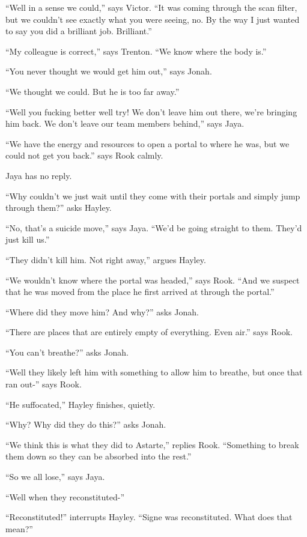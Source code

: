 ``Well in a sense we could,'' says Victor.  ``It was coming through the scan filter, but we couldn't see exactly what you were seeing, no.  By the way I just wanted to say you did a brilliant job.  Brilliant.''

``My colleague is correct,'' says Trenton.  ``We know where the body is.''

``You never thought we would get him out,'' says Jonah.

``We thought we could. But he is too far away.''

``Well you fucking better well try!  We don't leave him out there, we're bringing him back.  We don't leave our team members behind,'' says Jaya.

``We have the energy and resources to open a portal to where he was, but we could not get you back.'' says Rook calmly.

Jaya has no reply.

``Why couldn't we just wait until they come with their portals and simply jump through them?'' asks Hayley.

``No, that's a suicide move,'' says Jaya.  ``We'd be going straight to them.  They'd just kill us.''

``They didn't kill him.  Not right away,'' argues Hayley.

``We wouldn't know where the portal was headed,'' says Rook.  ``And we suspect that he was moved from the place he first arrived at through the portal.''

``Where did they move him?  And why?'' asks Jonah.

``There are places that are entirely empty of everything.  Even air.'' says Rook.

``You can't breathe?'' asks Jonah.

``Well they likely left him with something to allow him to breathe, but once that ran out-'' says Rook.

``He suffocated,'' Hayley finishes, quietly.

``Why?  Why did they do this?'' asks Jonah.

``We think this is what they did to Astarte,'' replies Rook.  ``Something to break them down so they can be absorbed into the rest.''

``So we all lose,'' says Jaya.

``Well when they reconstituted-''

``Reconstituted!'' interrupts Hayley.  ``Signe was reconstituted. What does that mean?''

